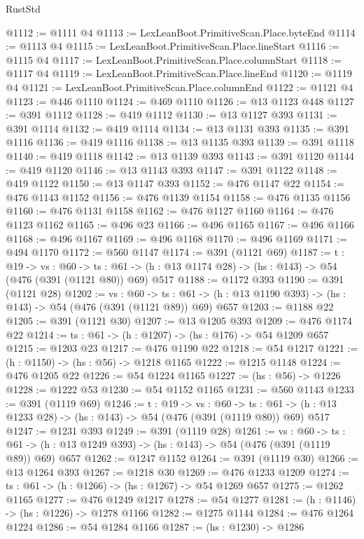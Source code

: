 \begin{lexlean}{RustStd}
\begin{coremodule}
@1112 := @1111 @4
@1113 := LexLeanBoot.PrimitiveScan.Place.byteEnd
@1114 := @1113 @4
@1115 := LexLeanBoot.PrimitiveScan.Place.lineStart
@1116 := @1115 @4
@1117 := LexLeanBoot.PrimitiveScan.Place.columnStart
@1118 := @1117 @4
@1119 := LexLeanBoot.PrimitiveScan.Place.lineEnd
@1120 := @1119 @4
@1121 := LexLeanBoot.PrimitiveScan.Place.columnEnd
@1122 := @1121 @4
@1123 := @446 @1110
@1124 := @469 @1110
@1126 := @13 @1123 @448
@1127 := @391 @1112
@1128 := @419 @1112
@1130 := @13 @1127 @393
@1131 := @391 @1114
@1132 := @419 @1114
@1134 := @13 @1131 @393
@1135 := @391 @1116
@1136 := @419 @1116
@1138 := @13 @1135 @393
@1139 := @391 @1118
@1140 := @419 @1118
@1142 := @13 @1139 @393
@1143 := @391 @1120
@1144 := @419 @1120
@1146 := @13 @1143 @393
@1147 := @391 @1122
@1148 := @419 @1122
@1150 := @13 @1147 @393
@1152 := @476 @1147 @22
@1154 := @476 @1143 @1152
@1156 := @476 @1139 @1154
@1158 := @476 @1135 @1156
@1160 := @476 @1131 @1158
@1162 := @476 @1127 @1160
@1164 := @476 @1123 @1162
@1165 := @496 @23
@1166 := @496 @1165
@1167 := @496 @1166
@1168 := @496 @1167
@1169 := @496 @1168
@1170 := @496 @1169
@1171 := @494 @1170
@1172 := @560 @1147
@1174 := @391 (@1121 @69)
@1187 := {t : @19} ->
  {vs : @60} ->
  {ts : @61} -> (h : @13 @1174 @28) -> (hs : @143) -> @54 (@476 (@391 (@1121 @80)) @69) @517
@1188 := @1172 @393
@1190 := @391 (@1121 @28)
@1202 := {vs : @60} ->
  {ts : @61} -> (h : @13 @1190 @393) -> (hs : @143) -> @54 (@476 (@391 (@1121 @89)) @69) @657
@1203 := @1188 @22
@1205 := @391 (@1121 @30)
@1207 := @13 @1205 @393
@1209 := @476 @1174 @22
@1214 := {ts : @61} -> (h : @1207) -> (hs : @176) -> @54 @1209 @657
@1215 := @1203 @23
@1217 := @476 @1190 @22
@1218 := @54 @1217
@1221 := (h : @1150) -> (hs : @56) -> @1218 @1165
@1222 := @1215 @1148
@1224 := @476 @1205 @22
@1226 := @54 @1224 @1165
@1227 := (hs : @56) -> @1226
@1228 := @1222 @53
@1230 := @54 @1152 @1165
@1231 := @560 @1143
@1233 := @391 (@1119 @69)
@1246 := {t : @19} ->
  {vs : @60} ->
  {ts : @61} -> (h : @13 @1233 @28) -> (hs : @143) -> @54 (@476 (@391 (@1119 @80)) @69) @517
@1247 := @1231 @393
@1249 := @391 (@1119 @28)
@1261 := {vs : @60} ->
  {ts : @61} -> (h : @13 @1249 @393) -> (hs : @143) -> @54 (@476 (@391 (@1119 @89)) @69) @657
@1262 := @1247 @1152
@1264 := @391 (@1119 @30)
@1266 := @13 @1264 @393
@1267 := @1218 @30
@1269 := @476 @1233 @1209
@1274 := {ts : @61} -> (h : @1266) -> (hs : @1267) -> @54 @1269 @657
@1275 := @1262 @1165
@1277 := @476 @1249 @1217
@1278 := @54 @1277
@1281 := (h : @1146) -> (hs : @1226) -> @1278 @1166
@1282 := @1275 @1144
@1284 := @476 @1264 @1224
@1286 := @54 @1284 @1166
@1287 := (hs : @1230) -> @1286

\end{coremodule}
\end{lexlean}
